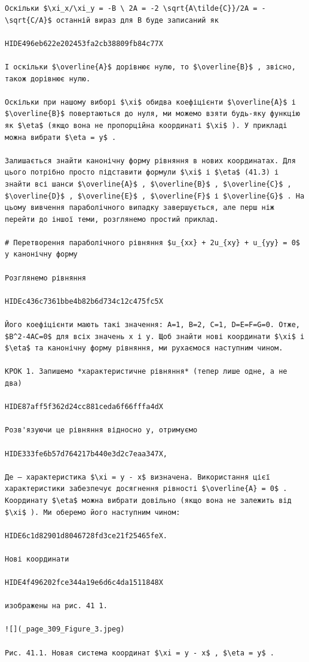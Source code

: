 \documentclass[
  ukrainian,
]{article}
\begin{document}
\begin{verbatim}
Оскільки $\xi_x/\xi_y = -B \ 2A = -2 \sqrt{A\tilde{C}}/2A = -\sqrt{C/A}$ останній вираз для B буде записаний як

HIDE496eb622e202453fa2cb38809fb84c77X

І оскільки $\overline{A}$ дорівнює нулю, то $\overline{B}$ , звісно, також дорівнює нулю.

Оскільки при нашому виборі $\xi$ обидва коефіцієнти $\overline{A}$ і $\overline{B}$ повертаються до нуля, ми можемо взяти будь-яку функцію як $\eta$ (якщо вона не пропорційна координаті $\xi$ ). У прикладі можна вибрати $\eta = y$ .

Залишається знайти канонічну форму рівняння в нових координатах. Для цього потрібно просто підставити формули $\xi$ і $\eta$ (41.3) і знайти всі шанси $\overline{A}$ , $\overline{B}$ , $\overline{C}$ , $\overline{D}$ , $\overline{E}$ , $\overline{F}$ і $\overline{G}$ . На цьому вивчення параболічного випадку завершується, але перш ніж перейти до іншої теми, розглянемо простий приклад.

# Перетворення параболічного рівняння $u_{xx} + 2u_{xy} + u_{yy} = 0$ у канонічну форму

Розглянемо рівняння

HIDEc436c7361bbe4b82b6d734c12c475fc5X

Його коефіцієнти мають такі значення: A=1, B=2, C=1, D=E=F=G=0. Отже, $B^2-4AC=0$ для всіх значень x і y. Щоб знайти нові координати $\xi$ і $\eta$ та канонічну форму рівняння, ми рухаємося наступним чином.

КРОК 1. Запишемо *характеристичне рівняння* (тепер лише одне, а не два)

HIDE87aff5f362d24cc881ceda6f66fffa4dX

Розв'язуючи це рівняння відносно y, отримуємо

HIDE333fe6b57d764217b440e3d2c7eaa347X,

Де — характеристика $\xi = y - x$ визначена. Використання цієї характеристики забезпечує досягнення рівності $\overline{A} = 0$ . Координату $\eta$ можна вибрати довільно (якщо вона не залежить від $\xi$ ). Ми оберемо його наступним чином:

HIDE6c1d82901d8046728fd3ce21f25465feX.

Нові координати

HIDE4f496202fce344a19e6d6c4da1511848X

изображены на рис. 41 1.

![](_page_309_Figure_3.jpeg)

Рис. 41.1. Новая система координат $\xi = y - x$ , $\eta = y$ .


\end{verbatim}
\end{document}
